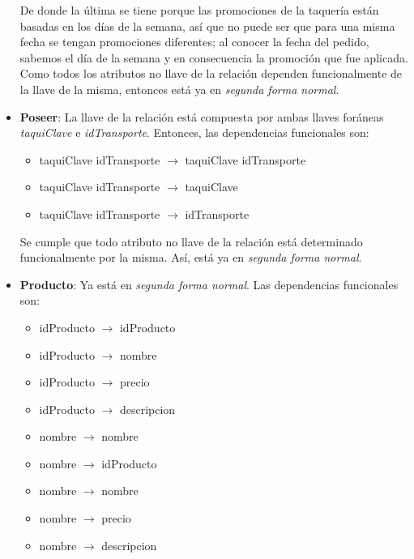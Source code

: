 \documentclass[11pt,letterpaper]{article}
\begin{document}
\begin{itemize}
De donde la última se tiene porque las promociones de la taquería están basadas en los días de la semana, así que no puede ser que para una misma fecha se tengan promociones diferentes; al conocer la fecha del pedido, sabemos el día de la semana y en consecuencia la promoción que fue aplicada.\\

Como todos los atributos no llave de la relación dependen funcionalmente de la llave de la misma, entonces está ya en \textit{segunda forma normal}.
\item \textbf{Poseer}: La llave de la relación está compuesta por ambas llaves foráneas \textit{taquiClave} e \textit{idTransporte}. Entonces, las dependencias funcionales son:

\begin{itemize}
\item taquiClave idTransporte $\rightarrow$ taquiClave idTransporte

\item taquiClave idTransporte $\rightarrow$ taquiClave
\item taquiClave idTransporte $\rightarrow$ idTransporte
\end{itemize}

Se cumple que todo atributo no llave de la relación está determinado funcionalmente por la misma. Así, está ya en \textit{segunda forma normal}.

\item \textbf{Producto}: Ya está en \textit{segunda forma normal}. Las dependencias funcionales son:

\begin{itemize}
\item idProducto $\rightarrow$ idProducto

\item idProducto $\rightarrow$ nombre
\item idProducto $\rightarrow$ precio
\item idProducto $\rightarrow$ descripcion
\item nombre $\rightarrow$ nombre

\item nombre $\rightarrow$ idProducto
\item nombre $\rightarrow$ nombre
\item nombre $\rightarrow$ precio
\item nombre $\rightarrow$ descripcion

\end{itemize}


\end{itemize}
\end{document}
